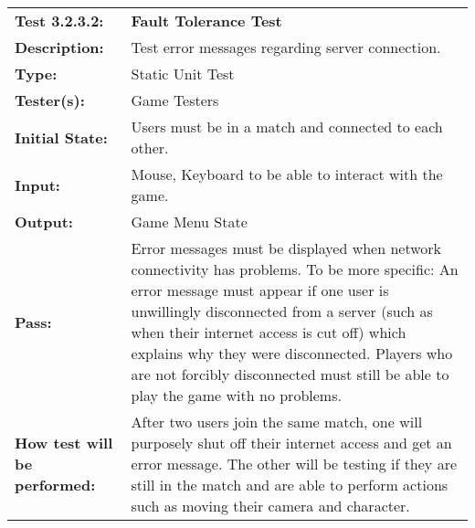 \documentclass[12pt, titlepage]{article}
\begin{document}
\begin{mdframed}[linewidth=1pt]
\begin{tabularx}{\textwidth}{@{}p{3cm}X@{}}
{\bf Test 3.2.3.2:} & {\bf Fault Tolerance Test}\\[\baselineskip]
{\bf Description:} & Test error messages regarding server connection.\\[0.5\baselineskip]
{\bf Type:} & Static Unit Test\\[0.5\baselineskip]
{\bf Tester(s):} & Game Testers\\[0.5\baselineskip]
{\bf Initial State:} & Users must be in a match and connected to each other.\\[0.5\baselineskip]
{\bf Input:} & Mouse, Keyboard to be able to interact with the game.\\[0.5\baselineskip]
{\bf Output:} & Game Menu State\\[0.5\baselineskip]
{\bf Pass:} & Error messages must be displayed when network connectivity has problems. To be more specific: An error message must appear if one user is unwillingly disconnected from a server (such as when their internet access is cut off) which explains why they were disconnected. Players who are not forcibly disconnected must still be able to play the game with no problems.\\[0.5\baselineskip]
{\bf How test will be performed:} & After two users join the same match, one will purposely shut off their internet access and get an error message. The other will be testing if they are still in the match and are able to perform actions such as moving their camera and character. 
\end{tabularx}
\end{mdframed}
\end{document}
